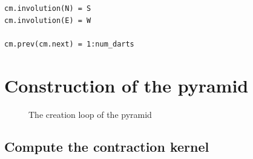 \documentclass[12pt]{article}
\begin{document}
\begin{lstlisting}
cm.involution(N) = S
cm.involution(E) = W

cm.prev(cm.next) = 1:num_darts
\end{lstlisting}




\section{Construction of the pyramid} %
\label{sec:construction_of_the_pyramid}

\begin{figure}[tb]
\centering
{}
\caption{The creation loop of the pyramid}%
\label{fig:creation loop}
\end{figure}

\subsection{Compute the contraction kernel} %
\label{sub:compute_the_contraction_kernel}
\end{document}
